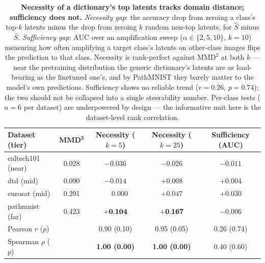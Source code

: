 \begin{table}[htbp]
\centering
\small
\caption{\textbf{Necessity of a dictionary's top latents tracks domain distance;
sufficiency does not.} \emph{Necessity gap}: the accuracy drop from zeroing a class's
top-$k$ latents minus the drop from zeroing $k$ random non-top latents, for $\hat{S}$
minus $\bar{S}$. \emph{Sufficiency gap}: AUC over an amplification sweep
($\alpha\in\{2,5,10\}$, $k=10$) measuring how often amplifying a target class's latents
on other-class images flips the prediction to that class. Necessity is rank-perfect
against $\mathrm{MMD}^2$ at both $k$ --- near the pretraining distribution the generic
dictionary's latents are as load-bearing as the finetuned one's, and by PathMNIST they
barely matter to the model's own predictions. Sufficiency shows no reliable trend
($r=0.26$, $p=0.74$); the two should not be collapsed into a single steerability number.
Per-class tests ($n=6$ per dataset) are underpowered by design --- the informative unit
here is the dataset-level rank correlation.}
\label{tab:h5_steering}
\setlength{\tabcolsep}{6pt}
\begin{tabular}{lcccc}
\toprule
\textbf{Dataset (tier)} & $\mathbf{MMD^2}$ & \textbf{Necessity ($k{=}5$)} & \textbf{Necessity ($k{=}25$)} & \textbf{Sufficiency (AUC)} \\
\midrule
caltech101 (near) & 0.028 & $-0.036$ & $-0.026$ & $-0.011$ \\
dtd (mid)         & 0.090 & $-0.014$ & $+0.008$ & $+0.004$ \\
eurosat (mid)     & 0.291 & $\phantom{-}0.000$ & $+0.047$ & $+0.030$ \\
pathmnist (far)   & 0.423 & $\bf +0.104$ & $\bf +0.167$ & $-0.006$ \\
\midrule
Pearson $r$ ($p$)   & & 0.90 (0.10) & 0.95 (0.05) & 0.26 (0.74) \\
Spearman $\rho$ ($p$) & & \bf 1.00 (0.00) & \bf 1.00 (0.00) & 0.40 (0.60) \\
\bottomrule
\end{tabular}
\end{table}
